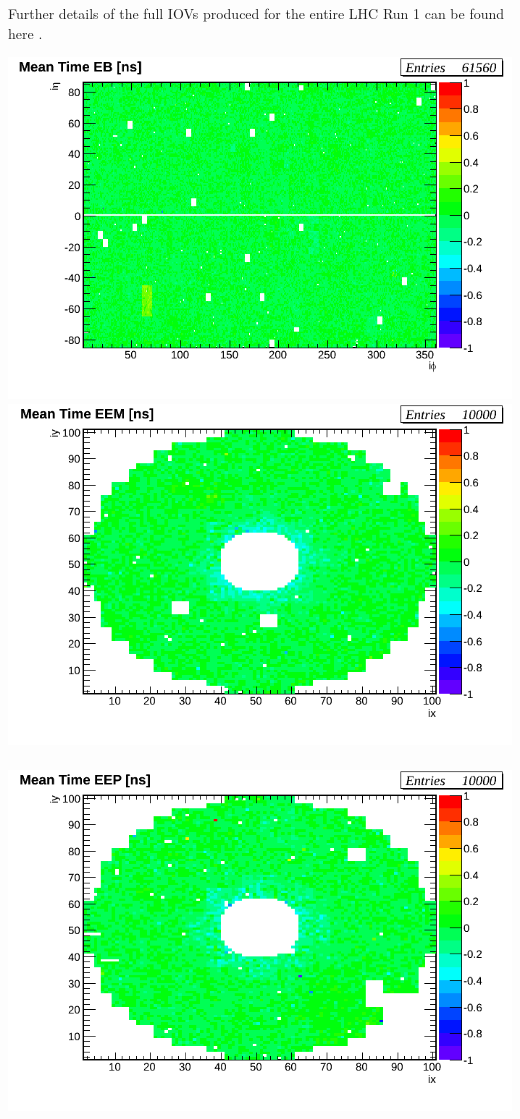 Further details of the full IOVs produced for the entire LHC Run 1 can be found here \cite{ECALCAL}.
\begin{center}
\centering
\mbox{\includegraphics[scale=0.35]{THESISPLOTS/calibDiffMapEB_Before_Calibration.png}}
\mbox{\includegraphics[scale=0.28]{THESISPLOTS/calibDiffMapEEM_Before_CALIB.png} \quad
\includegraphics[scale=0.28]{THESISPLOTS/calibDiffMapEEP_Before_CALIB.png}
}
\vspace{1.5cm}


\end{center}
